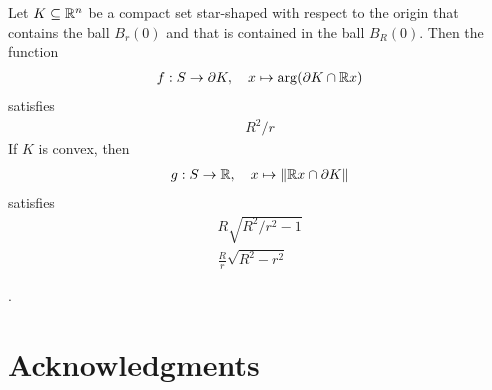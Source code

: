 \documentclass[12pt,a4paper]{article}
\begin{document}
\begin{lemma}
    Let $K \subseteq {\mathbb R}^{n}$ be a compact set star-shaped with respect to the origin 
    that contains the ball $B_{r}(0)$ and that is contained in the ball $B_{R}(0)$. Then the function 
    \begin{align*}
        f : S \rightarrow \partial K, \quad x \mapsto \arg( \partial K \cap {\mathbb R} x )
    \end{align*}
    satisfies 
    \begin{align*}
        R^{2}/r %
    \end{align*}
    If $K$ is convex, then 
    \begin{align*}
        g : S \rightarrow {\mathbb R}, \quad x \mapsto \| {\mathbb R} x \cap \partial K \|
    \end{align*}
    satisfies 
    \begin{align*}
        R \sqrt{ R^{2} / r^{2} - 1 } %
        \\
        \frac R r \sqrt{ R^{2} - r^{2} } %
    \end{align*}
\end{lemma}

\begin{lemma}
    .
\end{lemma}








\section*{Acknowledgments}



\end{document}
